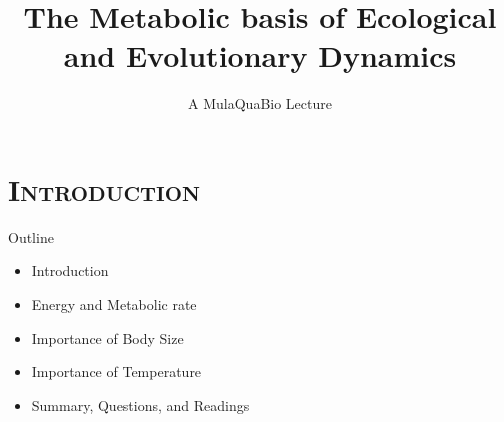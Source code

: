 



{
\begin{frame}[plain]

  \vspace{100pt}
  \title{\bf The Metabolic basis of Ecological and Evolutionary Dynamics}
  \subtitle{A MulaQuaBio Lecture}
 
\titlepage
\date{}

\end{frame}
}
\section{\scshape Introduction}

\begin{frame}{Outline}
  \begin{itemize}\setlength{\itemindent}{0em}\itemsep12pt

    \item Introduction

    \item Energy and Metabolic rate

		\item Importance of Body Size
		
		\item Importance of Temperature

    \item Summary, Questions, and Readings

  \end{itemize}  

\end{frame}


